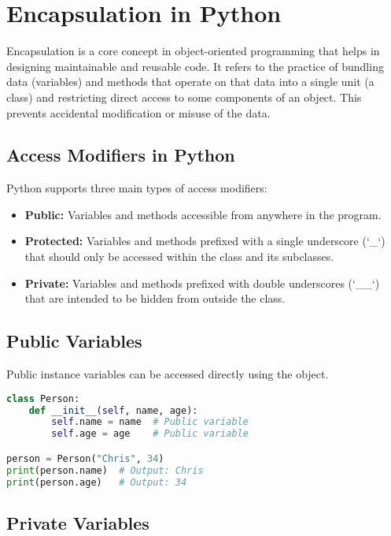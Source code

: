 \chapter{Encapsulation in Python}

Encapsulation is a core concept in object-oriented programming that helps in designing maintainable and reusable code. It refers to the practice of bundling data (variables) and methods that operate on that data into a single unit (a class) and restricting direct access to some components of an object. This prevents accidental modification or misuse of the data.

\section{Access Modifiers in Python}

Python supports three main types of access modifiers:

\begin{itemize}
    \item \textbf{Public:} Variables and methods accessible from anywhere in the program.
    \item \textbf{Protected:} Variables and methods prefixed with a single underscore (`\_`) that should only be accessed within the class and its subclasses.
    \item \textbf{Private:} Variables and methods prefixed with double underscores (`\_\_`) that are intended to be hidden from outside the class.
\end{itemize}

\section{Public Variables}

Public instance variables can be accessed directly using the object.

\begin{lstlisting}[language=Python, caption=Public Variables Example]
class Person:
    def __init__(self, name, age):
        self.name = name  # Public variable
        self.age = age    # Public variable

person = Person("Chris", 34)
print(person.name)  # Output: Chris
print(person.age)   # Output: 34
\end{lstlisting}

\section{Private Variables}

